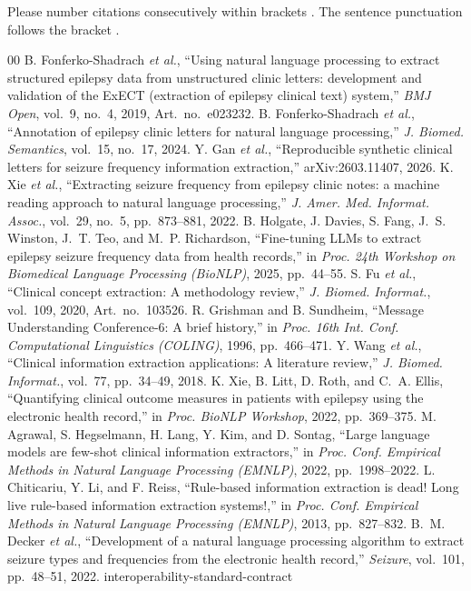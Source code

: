 \documentclass[conference]{IEEEtran}
\begin{document}
Please number citations consecutively within brackets \cite{b1}. The 
sentence punctuation follows the bracket \cite{b2}. 

\begin{thebibliography}{00}
 B. Fonferko-Shadrach \emph{et al.}, ``Using natural language processing to extract structured epilepsy data from unstructured clinic letters: development and validation of the ExECT (extraction of epilepsy clinical text) system,'' \emph{BMJ Open}, vol.~9, no.~4, 2019, Art.~no.~e023232.
 B. Fonferko-Shadrach \emph{et al.}, ``Annotation of epilepsy clinic letters for natural language processing,'' \emph{J. Biomed. Semantics}, vol.~15, no.~17, 2024.
 Y. Gan \emph{et al.}, ``Reproducible synthetic clinical letters for seizure frequency information extraction,'' arXiv:2603.11407, 2026.
 K. Xie \emph{et al.}, ``Extracting seizure frequency from epilepsy clinic notes: a machine reading approach to natural language processing,'' \emph{J. Amer. Med. Informat. Assoc.}, vol.~29, no.~5, pp.~873--881, 2022.
 B. Holgate, J. Davies, S. Fang, J.~S. Winston, J.~T. Teo, and M.~P. Richardson, ``Fine-tuning LLMs to extract epilepsy seizure frequency data from health records,'' in \emph{Proc. 24th Workshop on Biomedical Language Processing (BioNLP)}, 2025, pp.~44--55.
 S. Fu \emph{et al.}, ``Clinical concept extraction: A methodology review,'' \emph{J. Biomed. Informat.}, vol.~109, 2020, Art.~no.~103526.
 R. Grishman and B. Sundheim, ``Message Understanding Conference-6: A brief history,'' in \emph{Proc. 16th Int. Conf. Computational Linguistics (COLING)}, 1996, pp.~466--471.
 Y. Wang \emph{et al.}, ``Clinical information extraction applications: A literature review,'' \emph{J. Biomed. Informat.}, vol.~77, pp.~34--49, 2018.
 K. Xie, B. Litt, D. Roth, and C.~A. Ellis, ``Quantifying clinical outcome measures in patients with epilepsy using the electronic health record,'' in \emph{Proc. BioNLP Workshop}, 2022, pp.~369--375.
 M. Agrawal, S. Hegselmann, H. Lang, Y. Kim, and D. Sontag, ``Large language models are few-shot clinical information extractors,'' in \emph{Proc. Conf. Empirical Methods in Natural Language Processing (EMNLP)}, 2022, pp.~1998--2022.
 L. Chiticariu, Y. Li, and F. Reiss, ``Rule-based information extraction is dead! Long live rule-based information extraction systems!,'' in \emph{Proc. Conf. Empirical Methods in Natural Language Processing (EMNLP)}, 2013, pp.~827--832.
 B.~M. Decker \emph{et al.}, ``Development of a natural language processing algorithm to extract seizure types and frequencies from the electronic health record,'' \emph{Seizure}, vol.~101, pp.~48--51, 2022.
 interoperability-standard-contract
\end{thebibliography}

\vspace{12pt}
\end{document}
